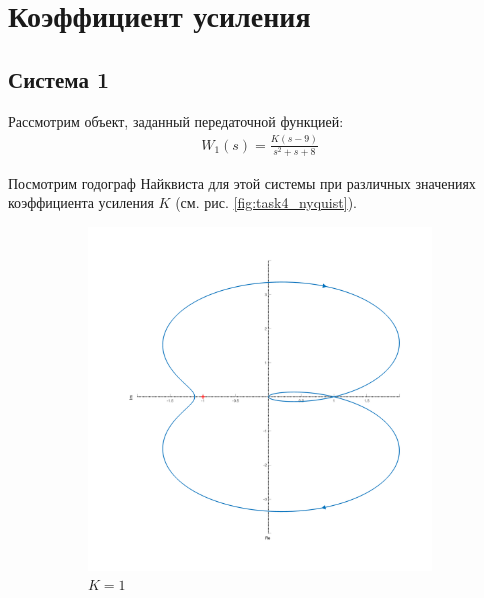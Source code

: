 \section{Коэффициент усиления}
\subsection{Система 1}
Рассмотрим объект, заданный передаточной функцией:
\begin{eqnarray}
    W_1(s) = \frac{K(s - 9)}{s^2 + s + 8}
\end{eqnarray}

Посмотрим годограф Найквиста для этой системы при различных значениях коэффициента усиления $K$ (см. рис. \ref{fig:task4_nyquist}).
\begin{figure}[ht!]
    \begin{subfigure}{0.5\textwidth}
        \centering
        \includegraphics[width=\textwidth]{media/plots/task4_nyquist_1.png}
        \caption{$K = 1$}
    \end{subfigure}%
    \begin{subfigure}{0.5\textwidth}
        \centering

\end{subfigure}
\end{figure}
